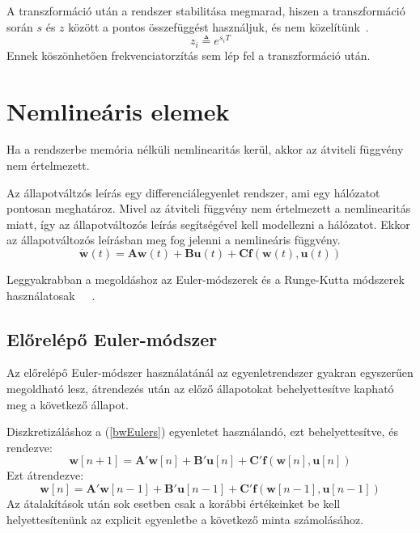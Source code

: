 A transzformáció után a rendszer stabilitása megmarad, hiszen a transzformáció során $s$ és $z$ között a pontos összefüggést használjuk, és nem közelítünk~\cite{transformations}. 
\begin{equation}
    z_i\triangleq e^{s_i T}
\end{equation} 
Ennek köszönhetően frekvenciatorzítás sem lép fel a transzformáció után.




\section{Nemlineáris elemek}
Ha a rendszerbe memória nélküli nemlinearitás kerül, akkor az átviteli függvény nem értelmezett.

Az állapotváltzós leírás egy differenciálegyenlet rendszer, ami egy hálózatot pontosan meghatároz. Mivel az átviteli függvény nem értelmezett a nemlinearitás miatt, így az állapotváltozós leírás segítségével kell modellezni a hálózatot. Ekkor az állapotváltozós leírásban 
meg fog jelenni a nemlineáris függvény.
\begin{equation}
    \mathbf{\dot{w}}(t)=\mathbf{A}\mathbf{w}(t)+\mathbf{Bu}(t)+\mathbf{Cf}(\mathbf{w}(t),\mathbf{u}(t))
\end{equation}

Leggyakrabban a megoldáshoz az Euler-módszerek és a Runge-Kutta módszerek használatosak~\cite{eulers}~\cite{rungekutta}~\cite{rkk}.

\subsection{Előrelépő Euler-módszer}
Az előrelépő Euler-módszer használatánál az egyenletrendszer gyakran egyszerűen megoldható lesz, átrendezés után az előző 
állapotokat behelyettesítve kapható meg a következő állapot.

Diszkretizáláshoz a (\ref{bwEulers}) egyenletet használandó, ezt behelyettesítve, és rendezve:
\begin{equation}
    \mathbf{w}[n+1]=\mathbf{A'}\mathbf{w}[n]+\mathbf{B'u}[n]+\mathbf{C'f}(\mathbf{w}[n], \mathbf{u}[n])
\end{equation}
Ezt átrendezve:
\begin{equation}
    \mathbf{w}[n]=\mathbf{A'}\mathbf{w}[n-1]+\mathbf{B'u}[n-1]+\mathbf{C'f}(\mathbf{w}[n-1],\mathbf{u}[n-1])
\end{equation}
Az átalakítások után sok esetben csak a korábbi értékeinket be kell helyettesítenünk az explicit egyenletbe a következő minta számolásához.

